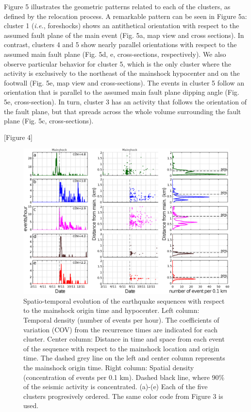 \documentclass[a4paper,12pt,twoside]{article}
\begin{document}
Figure 5 illustrates the geometric patterns related to each of the clusters, as defined by the relocation process. A remarkable pattern can be seen in Figure 5a: cluster 1 (\emph{i.e.}, foreshocks) shows an antithetical orientation with respect to the assumed fault plane of the main event (Fig. 5a, map view and cross sections). In contrast, clusters 4 and 5 show nearly parallel orientations with respect to the assumed main fault plane (Fig. 5d, e, cross-sections, respectively). We also observe particular behavior for cluster 5, which is the only cluster where the activity is exclusively to the northeast of the mainshock hypocenter and on the footwall (Fig. 5e, map view and cross-sections). The events in cluster 5 follow an orientation that is parallel to the assumed main fault plane dipping angle (Fig. 5e, cross-section). In turn, cluster 3 has an activity that follows the orientation of the fault plane, but that spreads across the whole volume surrounding the fault plane (Fig. 5c, cross-sections).

\begin{center}
   [Figure 4]
\end{center}

\begin{figure}
    \centering
     \includegraphics[width=1\linewidth]{densities_plot.eps}        
     \caption{Spatio-temporal evolution of the earthquake sequences with respect to the mainshock origin time and hypocenter. Left column: Temporal density (number of events per hour). The coefficients of variation (COV) from the recurrence times are indicated for each cluster. Center column: Distance in time and space from each event of the sequence with respect to the mainshock location and origin time. The dashed grey line on the left and center column represents the mainshock origin time. Right column: Spatial density (concentration of events per 0.1 km). Dashed black line, where 90\% of the seismic activity is concentrated. (a)-(e) Each of the five clusters progresively ordered. The same color code from Figure 3 is used.}
\end{figure}     \label{fig:time_each_cluster}
\end{document}
